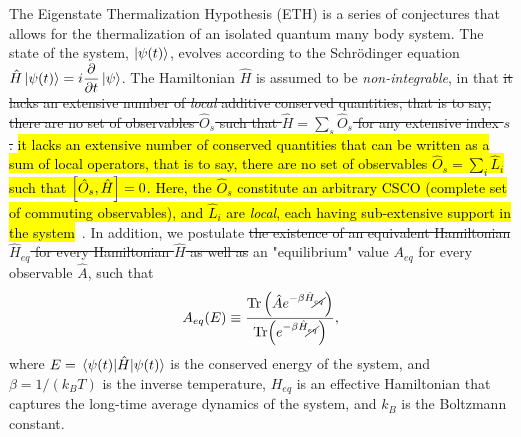 \documentclass[%
reprint,
superscriptaddress,
linenumbers,
amsmath,amssymb,
aps,
prb,
showkeys,
]{revtex4-2}
\begin{document}
The Eigenstate Thermalization Hypothesis (ETH) is a series of conjectures that allows for the thermalization of an isolated quantum many body system. The state of the system, $\ket{\psi(t)}$, evolves according to the Schr\"odinger equation $\hat{H}\ket{\psi(t)} = i\displaystyle\frac{\partial}{\partial t}\ket{\psi}$. The Hamiltonian $\hat{H}$ is assumed to be \textit{non-integrable}, in that \st{it lacks an extensive number of \textit{local} additive conserved quantities, that is to say, there are no set of observables $\hat{O}_s$ such that $\hat{H}=\sum_s \hat{O}_s$ for any extensive index $s$.} \hl{it lacks an extensive number of conserved quantities that can be written as a sum of local operators, that is to say, there are no set of observables   $\hat{O}_s = \sum_i \hat{L}_i$ such that $\comm{\hat{O}_s}{\hat{H}}=0$. Here, the $\hat{O}_s$ constitute an arbitrary CSCO (complete set of commuting observables), and $\hat{L}_i$ are \textit{local}, each having sub-extensive support in the system}~\cite{Sutherland2004}. In addition, we postulate \st{the existence of an equivalent Hamiltonian $\hat{H}_{eq}$ for every Hamiltonian $\hat{H}$ as well as} an "equilibrium" value $A_{eq}$ for every observable $\hat{A}$, such that
\begin{equation}
	\label{eq:aeq}
 A_{eq}(E)\equiv \frac{\Tr \left(\hat{A}e^{-\beta \hat{H}_{\cancel{eq}}}\right)}{\Tr(e^{-\beta \hat{H}_{\cancel{eq}}})},
\end{equation}
where $E=\expval{\hat{H}}{\psi(t)}$ is the conserved energy of the system, and $\beta = 1/(k_B T)$ is the inverse temperature, $H_{eq}$ is an effective Hamiltonian that captures the long-time average dynamics of the system, and $k_B$ is the Boltzmann constant.
\end{document}
